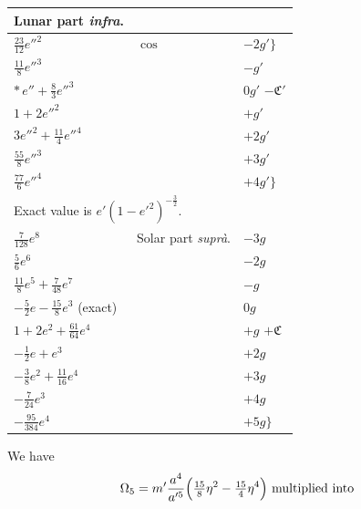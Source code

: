 \documentclass[12pt,a4paper]{article}
\theoremstyle{plain}
\begin{document}
\begin{center}
\begin{tabular}{|l|l|l|}
\hline
\multicolumn{1}{|c|}{Lunar part \textit{infra}.} & & \\
\hline
$\tfrac{23}{12}e''^{2}$              & $\cos$ & $-2g'\bigr\}$ \\
$\tfrac{11}{8}e''^{3}$               &        & $-g'$ \\
$*\,e''+\tfrac{8}{3}e''^{3}$         &        & $0g'$ \quad $-\mathfrak{C}'$ \\
$1+2e''^{2}$                         &        & $+g'$ \\
$3e''^{2}+\tfrac{11}{4}e''^{4}$      &        & $+2g'$ \\
$\tfrac{55}{8}e''^{3}$               &        & $+3g'$ \\
$\tfrac{77}{6}e''^{4}$               &        & $+4g'\bigr\}$ \\
\hline
\multicolumn{3}{|l|}{\small * Exact value is $e'(1-e'^{2})^{-\frac{3}{2}}$.} \\
\hline
$\tfrac{7}{128}e^{8}$                                & Solar part \textit{supr\`a}. & $-3g$ \\
$\tfrac{5}{6}e^{6}$                                  &                              & $-2g$ \\
$\tfrac{11}{8}e^{5}+\tfrac{7}{48}e^{7}$              &                              & $-g$ \\
$-\tfrac{5}{2}e-\tfrac{15}{8}e^{3}$ (exact)          &                              & $0g$ \\
$1+2e^{2}+\tfrac{61}{64}e^{4}$                       &                              & $+g$ \quad $+\mathfrak{C}$ \\
$-\tfrac{1}{2}e+e^{3}$                               &                              & $+2g$ \\
$-\tfrac{3}{8}e^{2}+\tfrac{11}{16}e^{4}$             &                              & $+3g$ \\
$-\tfrac{7}{24}e^{3}$                                &                              & $+4g$ \\
$-\tfrac{95}{384}e^{4}$                              &                              & $+5g\bigr\}$ \\
\hline
\end{tabular}
\end{center}

\newpage
{} We have
\[
\Omega_{5}=m'\frac{a^{4}}{a'^{5}}\Bigl(\tfrac{15}{8}\eta^{2}-\tfrac{15}{4}\eta^{4}\Bigr)\ \text{multiplied into}
\]
\end{document}

